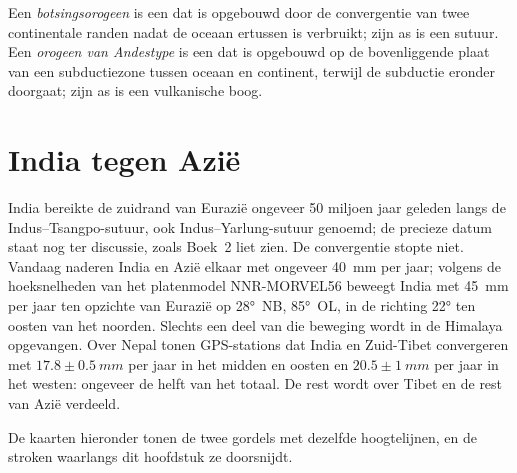 \begin{definition}\label{def:b2:himalaya-andes:types}
Een \emph{botsingsorogeen} is een  dat is opgebouwd door de convergentie van
twee continentale randen nadat de oceaan ertussen is verbruikt; zijn as is een sutuur.
Een \emph{orogeen van Andestype} is een  dat is opgebouwd op de bovenliggende
plaat van een subductiezone tussen oceaan en continent, terwijl de subductie eronder doorgaat; zijn as
is een vulkanische boog.
\end{definition}


\section{India tegen Azië}\label{sec:b2:himalaya-andes:himalaya}

India bereikte de zuidrand van Eurazië ongeveer 50 miljoen jaar geleden langs de
Indus--Tsangpo-sutuur, ook Indus--Yarlung-sutuur genoemd; de precieze datum staat nog ter discussie, zoals
Boek~2 liet zien. De convergentie stopte niet. Vandaag naderen India en Azië elkaar
met ongeveer \qty{40}{mm} per jaar; volgens de hoeksnelheden van het platenmodel NNR-MORVEL56
beweegt India met \qty{45}{mm} per jaar ten opzichte van Eurazië op \ang{28}~NB, \ang{85}~OL, in de richting
\ang{22} ten oosten van het noorden. Slechts een deel van die beweging wordt in de Himalaya opgevangen. Over Nepal
tonen GPS-stations dat India en Zuid-Tibet convergeren met $17.8 \pm \qty{0.5}{mm}$ per jaar in het
midden en oosten en $20.5 \pm \qty{1}{mm}$ per jaar in het westen: ongeveer de helft van het totaal. De rest
wordt over Tibet en de rest van Azië verdeeld.

De kaarten hieronder tonen de twee gordels met dezelfde hoogtelijnen, en de stroken waarlangs dit
hoofdstuk ze doorsnijdt.

